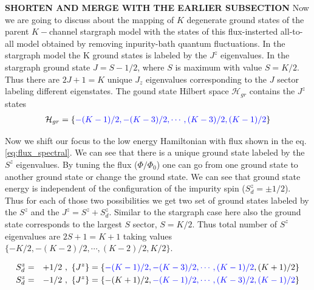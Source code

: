 \documentclass[reprint,prb,superscriptaddress]{revtex4-2}
\begin{document}
\textbf{SHORTEN AND MERGE WITH THE EARLIER SUBSECTION}
\noindent Now we are going to discuss about the mapping of $K$ degenerate ground states of the parent $K-$channel stargraph model with the states of this flux-insterted all-to-all model obtained by removing inpurity-bath quantum fluctuations. In the stargraph model the K ground states is labeled by the $J^z$ eigenvalues. In the stargraph ground state $J=S-1/2$, where $S$ is maximum with value $S=K/2$. Thus there are $2J+1=K$ unique $J_z$ eigenvalues corresponding to the $J$ sector labeling different eigenstates. The gound state Hilbert space $\mathcal{H}_{gr}$ contains the $J^z$ states
\begin{eqnarray}
\mathcal{H}_{gr}=\{\textcolor{blue}{-(K-1)/2,-(K-3)/2,\cdots , (K-3)/2,(K-1)/2}\} \nonumber\\
\label{eq:stargraph_states}
\end{eqnarray}
\par Now we shift our focus to the low energy Hamiltonian with flux shown in the eq.\eqref{eq:flux_spectral}. We can see that there is a unique ground state labeled by the $S^z$ eigenvalues. By tuning the flux ($\Phi/\Phi_0$) one can go from one ground state to another ground state or change the ground state. We can see that ground state energy is independent of the configuration of the impurity spin ($S_d^z=\pm 1/2$). Thus for each of those two possibilities we get two set of ground states labeled by the $S^z$ and the $J^z=S^z+S^z_d$. Similar to the stargraph case here also the ground state corresponds to the largest $S$ sector, $S=K/2$. Thus total number of $S^z$ eigenvalues are $2S+1=K+1$ taking values $\{ -K/2, -(K-2)/2, \cdots, (K-2)/2, K/2 \}$.
\begin{widetext}
\begin{eqnarray}
S_d^z &=& +1/2~,~ \{J^z\}=\{ \textcolor{blue}{-(K-1)/2, -(K-3)/2, \cdots, (K-1)/2}, (K+1)/2\} \nonumber\\
S_d^z &=& -1/2~,~ \{J^z\}=\{-(K+1)/2,\textcolor{blue}{ -(K-1)/2, \cdots, (K-3)/2, (K-1)/2 } \}
\label{eq:all_to_all_states}
\end{eqnarray}
\end{widetext}
\end{document}
